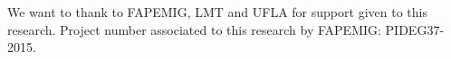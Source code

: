 We want to thank to FAPEMIG, LMT and UFLA for support given to this research.
Project number associated to this research by FAPEMIG: PIDEG37-2015.